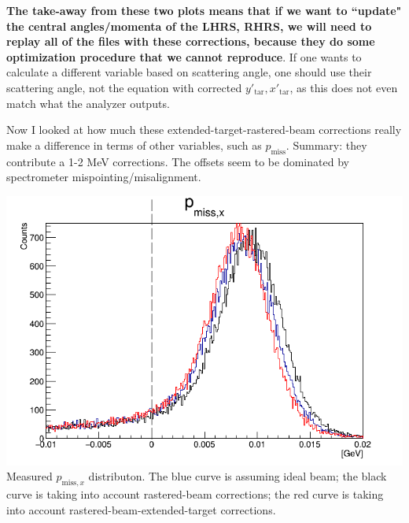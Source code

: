 \documentclass{article}
\begin{document}
\textbf{The take-away from these two plots means that if we want to ``update" the central angles/momenta of the LHRS, RHRS, we will need to replay all of the files with these corrections, because they do some optimization procedure that we cannot reproduce}. If one wants to calculate a different variable based on scattering angle, one should use their scattering angle, not the equation with corrected $y'_{\textrm{tar}} , x'_{\textrm{tar}}$, as this does not even match what the analyzer outputs.

\clearpage
Now I looked at how much these extended-target-rastered-beam corrections really make a difference in terms of other variables, such as $p_\textrm{miss}$. Summary: they contribute a 1-2 MeV corrections. The offsets seem to be dominated by spectrometer mispointing/misalignment.


\begin{center}
\includegraphics[width=14cm]{Pmx.png}\\
Measured $p_{\textrm{miss},x}$ distributon. The blue curve is assuming ideal beam; the black curve is taking into account rastered-beam corrections; the red curve is taking into account rastered-beam-extended-target corrections.
\end{center}
\end{document}
